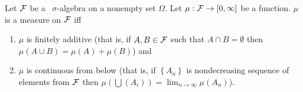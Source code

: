 \begin{theorem}
    Let ${\cal F}$ be a \ $\sigma$-algebra on a nonempty set $\Omega$. Let $\mu : {\cal F} \to  [0, \infty]$ be a function. $\mu$ is a measure on ${\cal F}$ iff 
	\begin{enumerate}
	    \item$\mu$ is finitely additive (that is, if $A,B \in {\cal F}$ such that $A\cap B =\emptyset$ then $\mu (A \cup B) = \mu (A) + \mu (B)$) and 
	    \item $\mu$ is continuous from below (that is, if $\left\{ A_n \right\}$ is nondecreasing sequence of elements from ${\cal F}$ then $\mu\left( \bigcup \left( A_i \right) \right) = \lim_{n\to\infty} \mu \left( A_n \right)$).
	    \end{enumerate}
    \label{thm:equiv-measure}
\end{theorem}
